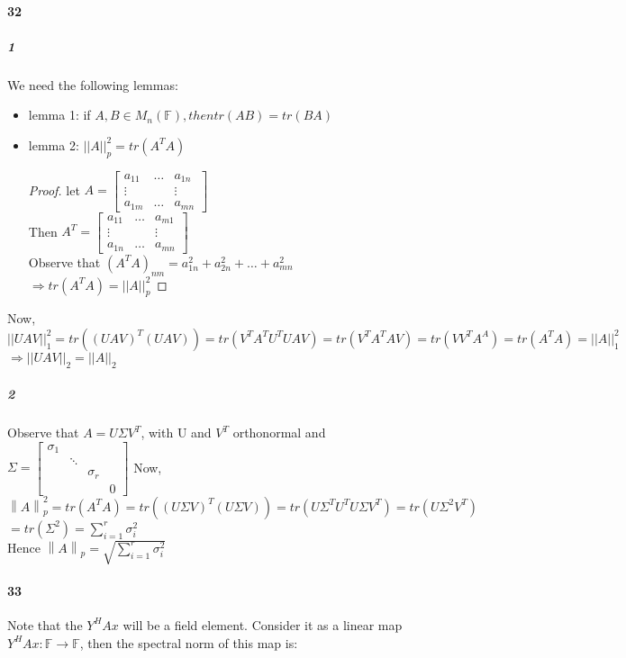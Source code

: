 \documentclass[10pt,letter]{article}
\newcommand\norm[1]{\left\lVert#1\right\rVert}
\begin{document}
\paragraph{32}
\subparagraph{1}
We need the following lemmas:\\
\begin{itemize}
	\item lemma 1: if $A,B\in M_n(\mathbb{F}), then tr(AB)=tr(BA)$
	\item lemma 2: $||A||^2_p=tr(A^TA)$
	\begin{proof}
		let $A=\begin{bmatrix}
			a_{11}&\dots&a_{1n}\\
			\vdots& &\vdots\\
			a_{1m}&\dots&a_{mn}
		\end{bmatrix}$\\
		Then $A^T=\begin{bmatrix}
		a_{11}&\dots&a_{m1}\\
		\vdots& &\vdots\\
		a_{1n}&\dots&a_{mn}
		\end{bmatrix}$\\
		Observe that $(A^TA)_{nm}=a_{1n}^2+a_{2n}^2+\dots+a_{mn}^2$\\
		$\Rightarrow tr(A^TA)=||A||_p^2$
	\end{proof}
\end{itemize}
Now, $||UAV||_1^2=tr((UAV)^T(UAV))=tr(V^TA^TU^TUAV)=tr(V^TA^TAV)=tr(VV^TA^A)=tr(A^TA)=||A||_1^2$\\
$\Rightarrow ||UAV||_2=||A||_2$

\subparagraph{2}
Observe that $A=U\Sigma V^T$, with U and $V^T$ orthonormal and \\
$\Sigma=\begin{bmatrix}
\sigma_1& & & \\
&\ddots& & \\
&&\sigma_r&\\
&&&0
\end{bmatrix}$
Now, $\norm{A}_p^2=tr(A^TA)=tr((U\Sigma V)^T(U\Sigma V))=tr(U\Sigma^TU^TU\Sigma V^T)=tr(U\Sigma^2 V^T)$\\
$=tr(\Sigma^2)=\sum_{i=1}^r\sigma_i^2$\\
Hence $\norm{A}_p=\sqrt{\sum_{i=1}^r\sigma_i^2}$

\paragraph{33}
Note that the $Y^{H}Ax$ will be a field element. Consider it as a linear map $Y^{H}Ax: \mathbb{F} \to \mathbb{F}$, then the spectral norm of this map is:
\end{document}
